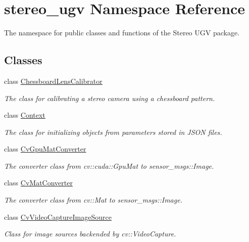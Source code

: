 \hypertarget{namespacestereo__ugv}{}\section{stereo\+\_\+ugv Namespace Reference}
\label{namespacestereo__ugv}


The namespace for public classes and functions of the Stereo U\+GV package.  


\subsection*{Classes}
\begin{DoxyCompactItemize}
\item 
class \hyperlink{classstereo__ugv_1_1ChessboardLensCalibrator}{Chessboard\+Lens\+Calibrator}
\begin{DoxyCompactList}\small\item\em The class for calibrating a stereo camera using a chessboard pattern. \end{DoxyCompactList}\item 
class \hyperlink{classstereo__ugv_1_1Context}{Context}
\begin{DoxyCompactList}\small\item\em The class for initializing objects from parameters stored in J\+S\+ON files. \end{DoxyCompactList}\item 
class \hyperlink{classstereo__ugv_1_1CvGpuMatConverter}{Cv\+Gpu\+Mat\+Converter}
\begin{DoxyCompactList}\small\item\em The converter class from cv\+::cuda\+::\+Gpu\+Mat to sensor\+\_\+msgs\+::\+Image. \end{DoxyCompactList}\item 
class \hyperlink{classstereo__ugv_1_1CvMatConverter}{Cv\+Mat\+Converter}
\begin{DoxyCompactList}\small\item\em The converter class from cv\+::\+Mat to sensor\+\_\+msgs\+::\+Image. \end{DoxyCompactList}\item 
class \hyperlink{classstereo__ugv_1_1CvVideoCaptureImageSource}{Cv\+Video\+Capture\+Image\+Source}
\begin{DoxyCompactList}\small\item\em Class for image sources backended by cv\+::\+Video\+Capture. \end{DoxyCompactList}\item 

\end{DoxyCompactItemize}
